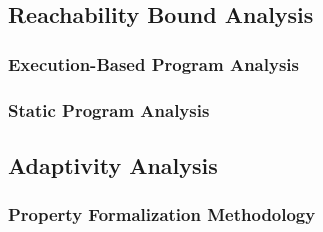 
\subsection{Reachability Bound Analysis}
\label{sec:intro-methodology-reachability}
\subsubsection{Execution-Based Program Analysis}

\subsubsection{Static Program Analysis}
\subsection{Adaptivity Analysis}
\label{sec:intro-methodology-adapt}
\subsubsection{Property Formalization Methodology}
